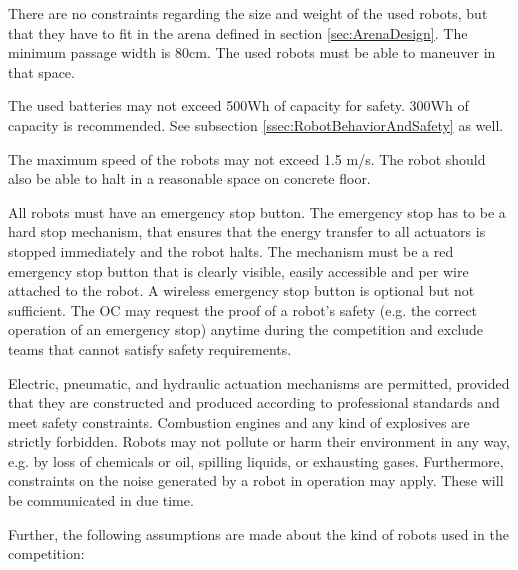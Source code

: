 There are no constraints regarding the size and weight of the used robots, but that they have to fit in the arena defined in section \ref{sec:ArenaDesign}. The minimum passage width is 80cm. The used robots must be able to maneuver in that space.\par

The used batteries may not exceed 500Wh of capacity for safety. 300Wh of capacity is recommended. See subsection \ref{ssec:RobotBehaviorAndSafety} as well.\par 

The maximum speed of the robots may not exceed 1.5 m/s. The robot should also be able to halt in a reasonable space on concrete floor.\par 
\par
All robots must have an emergency stop button. The emergency stop has to be a hard stop mechanism, that ensures that the energy transfer to all actuators is stopped immediately and the robot halts. The mechanism must be a red emergency stop button that is clearly visible, easily accessible and per wire attached to the robot. A wireless emergency stop button is optional but not sufficient.
The OC may request the proof of a robot's safety (e.g. the correct operation of an emergency stop) anytime during the competition and exclude teams that cannot satisfy safety requirements.
\par
Electric, pneumatic, and hydraulic actuation mechanisms are permitted, provided that they are constructed and produced according to professional standards and meet safety constraints. Combustion engines and any kind of explosives are strictly forbidden. Robots may not pollute or harm their environment in any way, e.g. by loss of chemicals or oil, spilling liquids, or exhausting gases. Furthermore, constraints on the noise generated by a robot in operation may apply. These will be communicated in due time.
\par
Further, the following assumptions are made about the kind of robots used in the competition:
\par
